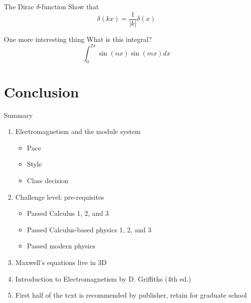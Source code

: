 \documentclass{beamer}
\begin{document}
\begin{frame}{The Dirac $\delta$-function}
Show that
\begin{equation}
\delta(kx) = \frac{1}{|k|}\delta(x)
\end{equation}
\end{frame}

\begin{frame}{One more interesting thing}
What is this integral?
\begin{equation}
\int_0^{2\pi} \sin(nx)\sin(mx) dx
\end{equation}
\end{frame}

\section{Conclusion}

\begin{frame}{Summary}
\begin{enumerate}
\item Electromagnetism and the module system
\begin{itemize}
\item Pace
\item Style
\item Class decision
\end{itemize}
\item Challenge level: pre-requisites
\begin{itemize}
\item Passed Calculus 1, 2, and 3
\item Passed Calculus-based physics 1, 2, and 3
\item Passed modern physics
\end{itemize}
\item Maxwell's equations live in 3D
\item \alert{Introduction to Electromagnetism by D. Griffiths (4th ed.)}
\item First half of the text is recommended by publisher, retain for graduate school
\end{enumerate}
\end{frame}
\end{document}
